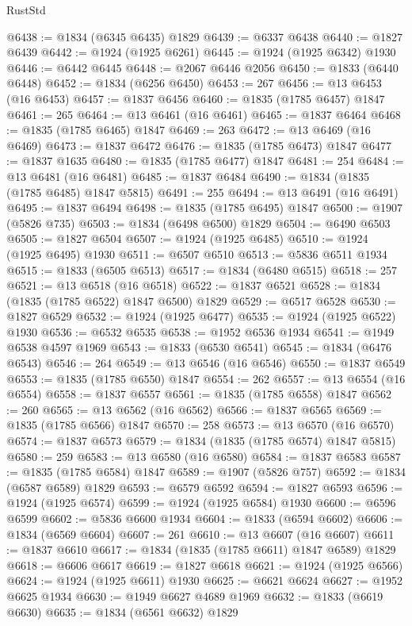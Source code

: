 \begin{lexlean}{RustStd}
\begin{coremodule}
@6438 := @1834 (@6345 @6435) @1829
@6439 := @6337 @6438
@6440 := @1827 @6439
@6442 := @1924 (@1925 @6261)
@6445 := @1924 (@1925 @6342) @1930
@6446 := @6442 @6445
@6448 := @2067 @6446 @2056
@6450 := @1833 (@6440 @6448)
@6452 := @1834 (@6256 @6450)
@6453 := 267
@6456 := @13 @6453 (@16 @6453)
@6457 := @1837 @6456
@6460 := @1835 (@1785 @6457) @1847
@6461 := 265
@6464 := @13 @6461 (@16 @6461)
@6465 := @1837 @6464
@6468 := @1835 (@1785 @6465) @1847
@6469 := 263
@6472 := @13 @6469 (@16 @6469)
@6473 := @1837 @6472
@6476 := @1835 (@1785 @6473) @1847
@6477 := @1837 @1635
@6480 := @1835 (@1785 @6477) @1847
@6481 := 254
@6484 := @13 @6481 (@16 @6481)
@6485 := @1837 @6484
@6490 := @1834 (@1835 (@1785 @6485) @1847 @5815)
@6491 := 255
@6494 := @13 @6491 (@16 @6491)
@6495 := @1837 @6494
@6498 := @1835 (@1785 @6495) @1847
@6500 := @1907 (@5826 @735)
@6503 := @1834 (@6498 @6500) @1829
@6504 := @6490 @6503
@6505 := @1827 @6504
@6507 := @1924 (@1925 @6485)
@6510 := @1924 (@1925 @6495) @1930
@6511 := @6507 @6510
@6513 := @5836 @6511 @1934
@6515 := @1833 (@6505 @6513)
@6517 := @1834 (@6480 @6515)
@6518 := 257
@6521 := @13 @6518 (@16 @6518)
@6522 := @1837 @6521
@6528 := @1834 (@1835 (@1785 @6522) @1847 @6500) @1829
@6529 := @6517 @6528
@6530 := @1827 @6529
@6532 := @1924 (@1925 @6477)
@6535 := @1924 (@1925 @6522) @1930
@6536 := @6532 @6535
@6538 := @1952 @6536 @1934
@6541 := @1949 @6538 @4597 @1969
@6543 := @1833 (@6530 @6541)
@6545 := @1834 (@6476 @6543)
@6546 := 264
@6549 := @13 @6546 (@16 @6546)
@6550 := @1837 @6549
@6553 := @1835 (@1785 @6550) @1847
@6554 := 262
@6557 := @13 @6554 (@16 @6554)
@6558 := @1837 @6557
@6561 := @1835 (@1785 @6558) @1847
@6562 := 260
@6565 := @13 @6562 (@16 @6562)
@6566 := @1837 @6565
@6569 := @1835 (@1785 @6566) @1847
@6570 := 258
@6573 := @13 @6570 (@16 @6570)
@6574 := @1837 @6573
@6579 := @1834 (@1835 (@1785 @6574) @1847 @5815)
@6580 := 259
@6583 := @13 @6580 (@16 @6580)
@6584 := @1837 @6583
@6587 := @1835 (@1785 @6584) @1847
@6589 := @1907 (@5826 @757)
@6592 := @1834 (@6587 @6589) @1829
@6593 := @6579 @6592
@6594 := @1827 @6593
@6596 := @1924 (@1925 @6574)
@6599 := @1924 (@1925 @6584) @1930
@6600 := @6596 @6599
@6602 := @5836 @6600 @1934
@6604 := @1833 (@6594 @6602)
@6606 := @1834 (@6569 @6604)
@6607 := 261
@6610 := @13 @6607 (@16 @6607)
@6611 := @1837 @6610
@6617 := @1834 (@1835 (@1785 @6611) @1847 @6589) @1829
@6618 := @6606 @6617
@6619 := @1827 @6618
@6621 := @1924 (@1925 @6566)
@6624 := @1924 (@1925 @6611) @1930
@6625 := @6621 @6624
@6627 := @1952 @6625 @1934
@6630 := @1949 @6627 @4689 @1969
@6632 := @1833 (@6619 @6630)
@6635 := @1834 (@6561 @6632) @1829

\end{coremodule}
\end{lexlean}
